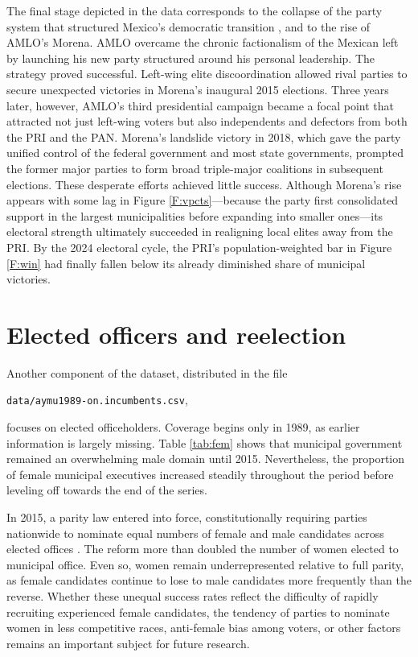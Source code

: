 \documentclass[letter,12pt]{article}
\begin{document}
The final stage depicted in the data corresponds to the collapse of the party system that structured Mexico's democratic transition \citep{moreno.decisElec.2009}, and to the rise of AMLO's Morena. AMLO overcame the chronic factionalism of the Mexican left \citep{bruhn.1997} by launching his new party structured around his personal leadership. The strategy proved successful. Left-wing elite discoordination allowed rival parties to secure unexpected victories in Morena's inaugural 2015 elections. Three years later, however, AMLO's third presidential campaign became a focal point that attracted not just left-wing voters but also independents and defectors from both the PRI and the PAN. Morena's landslide victory in 2018, which gave the party unified control of the federal government and most state governments, prompted the former major parties to form broad triple-major coalitions in subsequent elections. These desperate efforts achieved little success. Although Morena's rise appears with some lag in Figure \ref{F:vpcts}---because the party first consolidated support in the largest municipalities before expanding into smaller ones---its electoral strength ultimately succeeded in realigning local elites away from the PRI. By the 2024 electoral cycle, the PRI's population-weighted bar in Figure \ref{F:win} had finally fallen below its already diminished share of municipal victories.

\section{Elected officers and reelection}\label{S:incumbents}

Another component of the dataset, distributed in the file

\begin{center}
  \verb|data/aymu1989-on.incumbents.csv|,
\end{center}

\noindent focuses on elected officeholders. Coverage begins only in 1989, as earlier information is largely missing. Table \ref{tab:fem} shows that municipal government remained an overwhelming male domain until 2015. Nevertheless, the proportion of female municipal executives increased steadily throughout the period before leveling off towards the end of the series.


In 2015, a parity law entered into force, constitutionally requiring parties nationwide to nominate equal numbers of female and male candidates across elected offices \citep{piscopo.2016}. The reform more than doubled the number of women elected to municipal office. Even so, women remain underrepresented relative to full parity, as female candidates continue to lose to male candidates more frequently than the reverse. Whether these unequal success rates reflect the difficulty of rapidly recruiting experienced female candidates, the tendency of parties to nominate women in less competitive races, anti-female bias among voters, or other factors remains an important subject for future research. 
\end{document}
